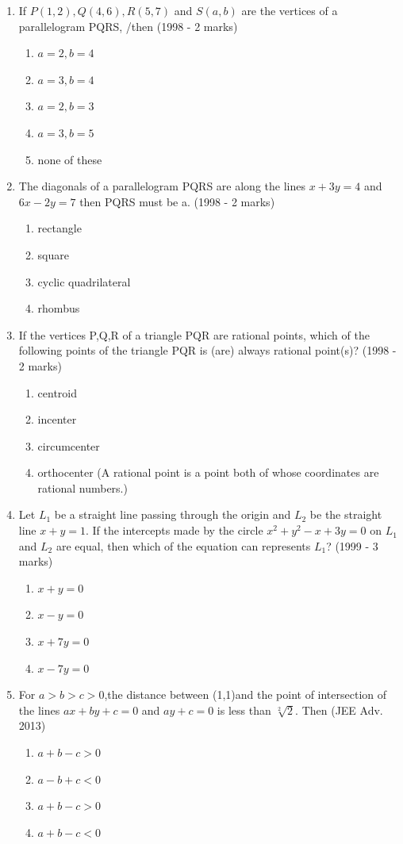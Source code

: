 \documentclass[12pt]{article}
\begin{document}
\begin{enumerate}
\item  If $P(1,2),Q(4,6),R(5,7)$ and $S(a,b)$ are the vertices of a parallelogram PQRS, /then (1998 - 2 marks)\\
\begin{enumerate}
\item $a=2,b=4$
\item $a=3,b=4$ 
\item $a=2,b=3$
\item $a=3,b=5$
\item none of these
\end{enumerate}
\item The diagonals of a parallelogram PQRS are along the lines $x+3y=4$ and $6x-2y=7$ then PQRS must be a. (1998 - 2 marks)\\
\begin{enumerate}
\item rectangle
\item square
\item cyclic quadrilateral
\item rhombus
\end{enumerate}
\item If the vertices P,Q,R of a triangle PQR are rational points, which of the following points of the triangle PQR is (are) always rational point(s)? (1998 - 2 marks)\\
\begin{enumerate}
\item centroid 
\item incenter
\item circumcenter 
\item orthocenter
(A rational point is a point both of whose coordinates are rational numbers.)
\end{enumerate}
\item  Let $L_1$ be a straight line passing through the origin and $L_2$ be the straight line $x+y=1$. If the intercepts made by the circle $x^2+y^2-x+3y=0$ on $L_1$ and $L_2$ are equal, then which of the equation can represents $L_1$? (1999 - 3 marks)\\
\begin{enumerate}
\item $x+y=0$   
\item $x-y=0$ 
\item $x+7y=0$  
\item $x-7y=0$
\end{enumerate}
\item For $a>b>c>0$,the distance between (1,1)and the point of intersection of the lines $ax+by+c=0$ and $ay+c=0$ is less than $\sqrt[2]{2}$. Then (JEE Adv. 2013)\\
\begin{enumerate}
\item $a+b-c>0$ 
\item $a-b+c<0$
\item $a+b-c>0$
\item $a+b-c<0$
\end{enumerate}

\end{enumerate}
\end{document}
